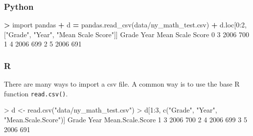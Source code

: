 \documentclass[
]{book}
\newenvironment{Shaded}{\begin{snugshade}}{\end{snugshade}}
\newcommand{\DecValTok}[1]{\textcolor[rgb]{0.00,0.00,0.81}{#1}}
\newcommand{\FunctionTok}[1]{\textcolor[rgb]{0.00,0.00,0.00}{#1}}
\newcommand{\ImportTok}[1]{#1}
\newcommand{\NormalTok}[1]{#1}
\newcommand{\OperatorTok}[1]{\textcolor[rgb]{0.81,0.36,0.00}{\textbf{#1}}}
\newcommand{\OtherTok}[1]{\textcolor[rgb]{0.56,0.35,0.01}{#1}}
\newcommand{\SpecialCharTok}[1]{\textcolor[rgb]{0.00,0.00,0.00}{#1}}
\newcommand{\StringTok}[1]{\textcolor[rgb]{0.31,0.60,0.02}{#1}}
\begin{document}
\hypertarget{python-10}{%
\subsubsection*{Python}\label{python-10}}

\begin{Shaded}
\begin{Highlighting}[]
\OperatorTok{\textgreater{}} \ImportTok{import}\NormalTok{ pandas}
\OperatorTok{+}\NormalTok{ d }\OperatorTok{=}\NormalTok{ pandas.read\_csv(}\StringTok{\textquotesingle{}data/ny\_math\_test.csv\textquotesingle{}}\NormalTok{)}
\OperatorTok{+}\NormalTok{ d.loc[}\DecValTok{0}\NormalTok{:}\DecValTok{2}\NormalTok{, [}\StringTok{"Grade"}\NormalTok{, }\StringTok{"Year"}\NormalTok{, }\StringTok{"Mean Scale Score"}\NormalTok{]]}
\NormalTok{  Grade  Year  Mean Scale Score}
\DecValTok{0}     \DecValTok{3}  \DecValTok{2006}               \DecValTok{700}
\DecValTok{1}     \DecValTok{4}  \DecValTok{2006}               \DecValTok{699}
\DecValTok{2}     \DecValTok{5}  \DecValTok{2006}               \DecValTok{691}
\end{Highlighting}
\end{Shaded}

\hypertarget{r-10}{%
\subsubsection*{R}\label{r-10}}

There are many ways to import a csv file. A common way is to use the base R function \texttt{read.csv()}.

\begin{Shaded}
\begin{Highlighting}[]
\SpecialCharTok{\textgreater{}}\NormalTok{ d }\OtherTok{\textless{}{-}} \FunctionTok{read.csv}\NormalTok{(}\StringTok{"data/ny\_math\_test.csv"}\NormalTok{)}
\SpecialCharTok{\textgreater{}}\NormalTok{ d[}\DecValTok{1}\SpecialCharTok{:}\DecValTok{3}\NormalTok{, }\FunctionTok{c}\NormalTok{(}\StringTok{"Grade"}\NormalTok{, }\StringTok{"Year"}\NormalTok{, }\StringTok{"Mean.Scale.Score"}\NormalTok{)]}
\NormalTok{  Grade Year Mean.Scale.Score}
\DecValTok{1}     \DecValTok{3} \DecValTok{2006}              \DecValTok{700}
\DecValTok{2}     \DecValTok{4} \DecValTok{2006}              \DecValTok{699}
\DecValTok{3}     \DecValTok{5} \DecValTok{2006}              \DecValTok{691}
\end{Highlighting}
\end{Shaded}
\end{document}
